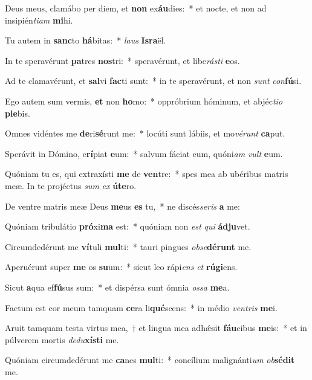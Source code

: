\item Deus meus, clamábo per diem, et \textbf{non} ex\textbf{áu}dies:~* et nocte, et non ad insipién\textit{ti}\textit{am} \textbf{mi}hi.
\item Tu autem in \textbf{sanc}to \textbf{há}bitas:~* \textit{laus} \textbf{Is}\textbf{ra}ël.
\item In te speravérunt \textbf{pa}tres \textbf{nos}tri:~* speravérunt, et libe\textit{rás}\textit{ti} \textbf{e}os.
\item Ad te clamavérunt, et \textbf{sal}vi \textbf{fac}ti sunt:~* in te speravérunt, et non \textit{sunt} \textit{con}\textbf{fú}si.
\item Ego autem sum vermis, \textbf{et} non \textbf{ho}mo:~* oppróbrium hóminum, et abjéc\textit{ti}\textit{o} \textbf{ple}bis.
\item Omnes vidéntes me \textbf{de}ri\textbf{sé}runt me:~* locúti sunt lábiis, et mo\textit{vé}\textit{runt} \textbf{ca}put.
\item Sperávit in Dómino, e\textbf{rí}piat \textbf{e}um:~* salvum fáciat eum, quóni\textit{am} \textit{vult} \textbf{e}um.
\item Quóniam tu es, qui extraxísti \textbf{me} de \textbf{ven}tre:~* spes mea ab ubéribus matris meæ. In te projéctus \textit{sum} \textit{ex} \textbf{ú}\textbf{te}ro.
\item De ventre matris meæ Deus \textbf{me}us \textbf{es} tu,~* ne discés\textit{se}\textit{ris} \textbf{a} me:
\item Quóniam tribulátio \textbf{pró}xi\textbf{ma} est:~* quóniam non \textit{est} \textit{qui} \textbf{ád}\textbf{ju}vet.
\item Circumdedérunt me \textbf{ví}tuli \textbf{mul}ti:~* tauri pingues \textit{ob}\textit{se}\textbf{dé}\textbf{runt} me.
\item Aperuérunt super \textbf{me} os \textbf{su}um:~* sicut leo rápi\textit{ens} \textit{et} \textbf{rú}\textbf{gi}ens.
\item Sicut \textbf{a}qua ef\textbf{fú}sus sum:~* et dispérsa sunt ómnia \textit{os}\textit{sa} \textbf{me}a.
\item Factum est cor meum tamquam \textbf{ce}ra li\textbf{qué}scens:~* in médio \textit{ven}\textit{tris} \textbf{me}i.
\item Aruit tamquam testa virtus mea,~† et lingua mea adhǽsit \textbf{fáu}cibus \textbf{me}is:~* et in púlverem mortis \textit{de}\textit{du}\textbf{xís}\textbf{ti} me.
\item Quóniam circumdedérunt me \textbf{ca}nes \textbf{mul}ti:~* concílium malignánti\textit{um} \textit{ob}\textbf{sé}\textbf{dit} me.
